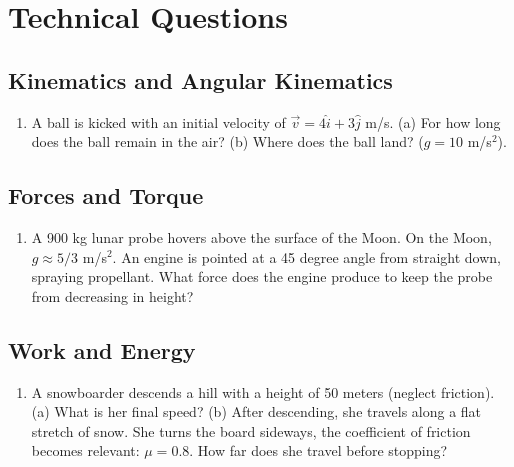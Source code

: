 \documentclass[10pt]{article}
\begin{document}
\section{Technical Questions}
\subsection{Kinematics and Angular Kinematics}
\begin{enumerate}
\item A ball is kicked with an initial velocity of $\vec{v} = 4\hat{i}+3\hat{j}$ m/s. (a) For how long does the ball remain in the air?  (b) Where does the ball land? ($g=10$ m/s$^2$). \\ \vspace{1.5cm}
\end{enumerate}
\subsection{Forces and Torque}
\begin{enumerate}
\item A 900 kg lunar probe hovers above the surface of the Moon.  On the Moon, $g \approx 5/3$ m/s$^2$.  An engine is pointed at a 45 degree angle from straight down, spraying propellant.  What force does the engine produce to keep the probe from decreasing in height?  \\ \vspace{1.5cm}
\end{enumerate}
\subsection{Work and Energy}
\begin{enumerate}
\item A snowboarder descends a hill with a height of 50 meters (neglect friction).  (a) What is her final speed?  (b) After descending, she travels along a flat stretch of snow.  She turns the board sideways, the coefficient of friction becomes relevant: $\mu = 0.8$.  How far does she travel before stopping? \\ \vspace{1.5cm}
\end{enumerate}
\end{document}
